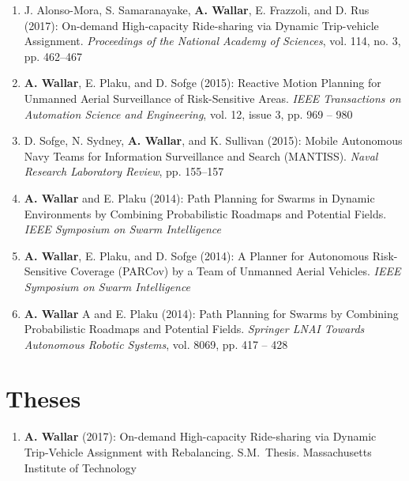 \documentclass[line,margin]{cv}
\begin{document}
\begin{resume}
\begin{enumerate}
    \item J. Alonso-Mora, S. Samaranayake, \textbf{A. Wallar},
        E. Frazzoli, and D. Rus (2017): On-demand High-capacity Ride-sharing via Dynamic Trip-vehicle
        Assignment.
        \textit{Proceedings of the National Academy of Sciences}, vol. 114, no. 3, pp. 462--467

    \item \textbf{A. Wallar}, E. Plaku, and D. Sofge (2015):
        Reactive Motion Planning for Unmanned Aerial Surveillance
        of Risk-Sensitive Areas. \textit{IEEE Transactions on Automation Science
    and Engineering}, vol. 12, issue 3, pp. 969 -- 980

    \item D. Sofge, N. Sydney, \textbf{A. Wallar}, and K. Sullivan (2015):
        Mobile Autonomous Navy Teams for Information Surveillance
        and Search (MANTISS). \textit{Naval Research Laboratory Review}, pp. 155--157

    \item \textbf{A. Wallar} and E. Plaku (2014): Path Planning for
        Swarms in Dynamic Environments by Combining Probabilistic Roadmaps
        and Potential Fields. \textit{IEEE Symposium on Swarm Intelligence}

    \item \textbf{A. Wallar}, E. Plaku, and D. Sofge (2014): A Planner
        for Autonomous Risk-Sensitive Coverage (PARCov) by a Team of Unmanned
        Aerial Vehicles. \textit{IEEE Symposium on Swarm Intelligence}

    \item \textbf{A. Wallar} A and E. Plaku (2014): Path Planning for
        Swarms by Combining Probabilistic Roadmaps and Potential Fields.
        \textit{Springer LNAI Towards Autonomous Robotic Systems}, vol. 8069,
        pp. 417 -- 428

\end{enumerate}

\section{Theses}

\begin{enumerate}


    \item \textbf{A. Wallar} (2017): On-demand High-capacity Ride-sharing via
        Dynamic Trip-Vehicle Assignment with Rebalancing. S.M.\ Thesis.
        Massachusetts Institute of Technology


\end{enumerate}
\end{resume}
\end{document}
